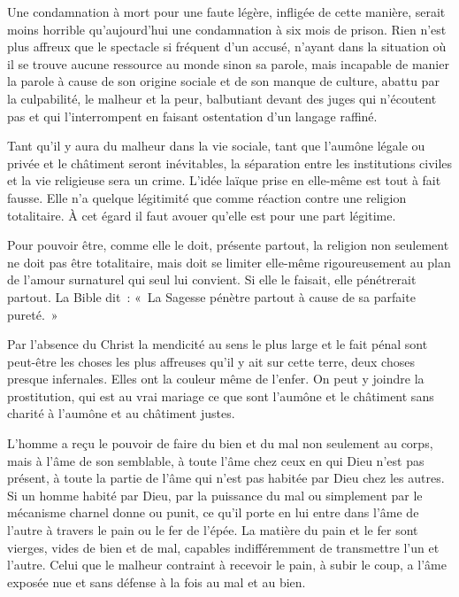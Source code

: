 \documentclass[french,twoside]{book} %
\begin{document}
Une condamnation à mort pour une faute légère, infligée de cette manière, serait moins horrible qu'aujourd'hui une condamnation à six mois de prison. Rien n'est plus affreux que le spectacle si fréquent d'un accusé, n'ayant dans la situation où il se trouve aucune ressource au monde sinon sa parole, mais incapable de manier la parole à cause de son origine sociale et de son manque de culture, abattu par la culpabilité, le malheur et la peur, balbutiant devant des juges qui n'écoutent pas et qui l'interrompent en faisant ostentation d'un langage raffiné.\par
Tant qu'il y aura du malheur dans la vie sociale, tant que l'aumône légale ou privée et le châtiment seront inévitables, la séparation entre les institutions civiles et la vie religieuse sera un crime. L'idée laïque prise en elle-même est tout à fait fausse. Elle n'a quelque légitimité que comme réaction contre une religion totalitaire. À cet égard il faut avouer qu'elle est pour une part légitime.\par
Pour pouvoir être, comme elle le doit, présente partout, la religion non seulement ne doit pas être totalitaire, mais doit se limiter elle-même rigoureusement au plan de l'amour surnaturel qui seul lui convient. Si elle le faisait, elle pénétrerait partout. La Bible dit : « La Sagesse pénètre partout à cause de sa parfaite pureté. »\par
Par l'absence du Christ la mendicité au sens le plus large et le fait pénal sont peut-être les choses les plus affreuses qu'il y ait sur cette terre, deux choses presque infernales. Elles ont la couleur même de l'enfer. On peut y joindre la prostitution, qui est au vrai mariage ce que sont l'aumône et le châtiment sans charité à l'aumône et au châtiment justes.\par
L'homme a reçu le pouvoir de faire du bien et du mal non seulement au corps, mais à l'âme de son semblable, à toute l'âme chez ceux en qui Dieu n'est pas présent, à toute la partie de l'âme qui n'est pas habitée par Dieu chez les autres. Si un homme habité par Dieu, par la puissance du mal ou simplement par le mécanisme charnel donne ou punit, ce qu'il porte en lui entre dans l'âme de l'autre à travers le pain ou le fer de l'épée. La matière du pain et le fer sont vierges, vides de bien et de mal, capables indifféremment de transmettre l'un et l'autre. Celui que le malheur contraint à recevoir le pain, à subir le coup, a l'âme exposée nue et sans défense à la fois au mal et au bien.\par
\end{document}
